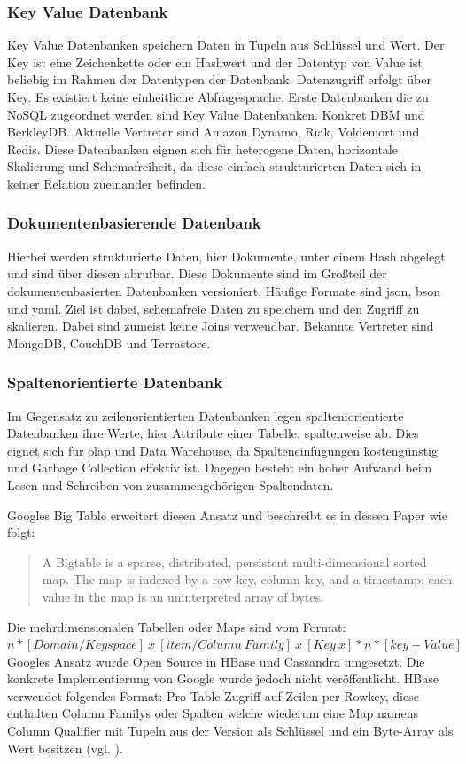 \subsubsection{Key Value Datenbank}
Key Value Datenbanken speichern Daten in Tupeln aus Schlüssel und Wert.
Der Key ist eine Zeichenkette oder ein Hashwert und der Datentyp von Value ist beliebig im Rahmen der Datentypen der Datenbank.
Datenzugriff erfolgt über Key.
Es existiert keine einheitliche Abfragesprache.
Erste Datenbanken die zu NoSQL zugeordnet werden sind Key Value Datenbanken. Konkret DBM und BerkleyDB.
Aktuelle Vertreter sind Amazon Dynamo, Riak, Voldemort und Redis.
Diese Datenbanken eignen sich für heterogene Daten, horizontale Skalierung und Schemafreiheit, da diese einfach strukturierten Daten sich in keiner Relation zueinander befinden.

\subsubsection{Dokumentenbasierende Datenbank}

Hierbei werden strukturierte Daten, hier Dokumente, unter einem Hash abgelegt und sind über diesen abrufbar.
Diese Dokumente sind im Großteil der dokumentenbasierten Datenbanken versioniert.
Häufige Formate sind \Gls{json}, \Gls{bson} und \Gls{yaml}.
Ziel ist dabei, schemafreie Daten zu speichern und den Zugriff zu skalieren.
Dabei sind zumeist keine Joins verwendbar.
Bekannte Vertreter sind MongoDB, CouchDB und Terrastore.

\subsubsection{Spaltenorientierte Datenbank}

Im Gegensatz zu zeilenorientierten Datenbanken legen spalteniorientierte Datenbanken ihre Werte, hier Attribute einer Tabelle, spaltenweise ab.
Dies eignet sich für \Gls{olap} und Data Warehouse, da Spalteneinfügungen kostengünstig und Garbage Collection effektiv ist.
Dagegen besteht ein hoher Aufwand beim Lesen und Schreiben von zusammengehörigen Spaltendaten.

Googles Big Table erweitert diesen Ansatz und beschreibt es in dessen Paper wie folgt:
\begin{quote}
A  Bigtable  is  a  sparse,  distributed,  persistent  multi-dimensional sorted map. The map is indexed by a row key, column key, and a timestamp; each value in the map is an uninterpreted array of bytes. \cite[S.1]{paper:bigtable}
\end{quote}
Die mehrdimensionalen Tabellen oder Maps sind vom Format:\\
$n*[Domain / Keyspace]\ x\ [item / Column\ Family]\ x\ [Key\ x]*n*[key+Value]$
Googles Ansatz wurde Open Source in HBase und Cassandra umgesetzt. Die konkrete Implementierung von Google wurde jedoch nicht veröffentlicht.
HBase verwendet folgendes Format: Pro Table Zugriff auf Zeilen per Rowkey, diese enthalten Column Familys oder Spalten welche wiederum eine Map namens Column Qualifier mit Tupeln aus der Version als Schlüssel und ein Byte-Array als Wert besitzen (vgl. \cite[S.13]{ba:dan}).

